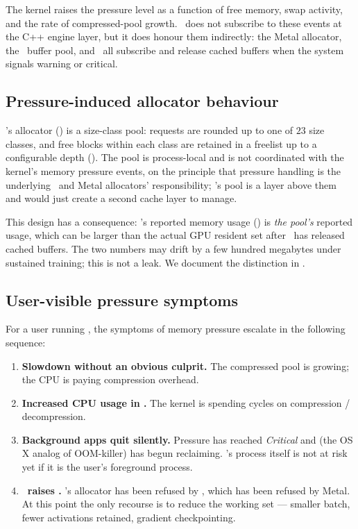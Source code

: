 The kernel raises the pressure level as a function of free memory,
swap activity, and the rate of compressed-pool growth. \Lucid\ does
not subscribe to these events at the C++ engine layer, but it does
honour them indirectly: the Metal allocator, the \MLX\ buffer pool,
and \Accelerate\ all subscribe and release cached buffers when the
system signals warning or critical.

\subsection{Pressure-induced allocator behaviour}
\label{ssec:unified_memory:allocator_pressure}

\Lucid's allocator () is a
size-class pool: requests are rounded up to one of \(23\) size
classes, and free blocks within each class are retained in a freelist
up to a configurable depth (). The pool is
process-local and is not coordinated with the kernel's memory
pressure events, on the principle that pressure handling is the
underlying \MLX\ and Metal allocators' responsibility; \Lucid's pool
is a layer above them and would just create a second cache layer to
manage.

This design has a consequence: \Lucid's reported memory usage
() is \emph{the pool's} reported usage,
which can be larger than the actual GPU resident set after \MLX\
has released cached buffers. The two numbers may drift by a few
hundred megabytes under sustained training; this is not a leak. We
document the distinction in \secref{sec:unified_memory:accounting}.

\subsection{User-visible pressure symptoms}
\label{ssec:unified_memory:pressure_symptoms}

For a user running \Lucid, the symptoms of memory pressure escalate
in the following sequence:

\begin{enumerate}
  \item \textbf{Slowdown without an obvious culprit.} The compressed
    pool is growing; the CPU is paying compression overhead.
  \item \textbf{Increased CPU usage in .} The
    kernel is spending cycles on compression / decompression.
  \item \textbf{Background apps quit silently.} Pressure has reached
    \emph{Critical} and \code{jetsam} (the OS X analog of OOM-killer)
    has begun reclaiming. \Lucid's process itself is not at risk yet
    if it is the user's foreground process.
  \item \textbf{\Lucid\ raises .}
    \Lucid's allocator has been refused by \MLX, which has been
    refused by Metal. At this point the only recourse is to reduce
    the working set --- smaller batch, fewer activations retained,
    gradient checkpointing.
\end{enumerate}

